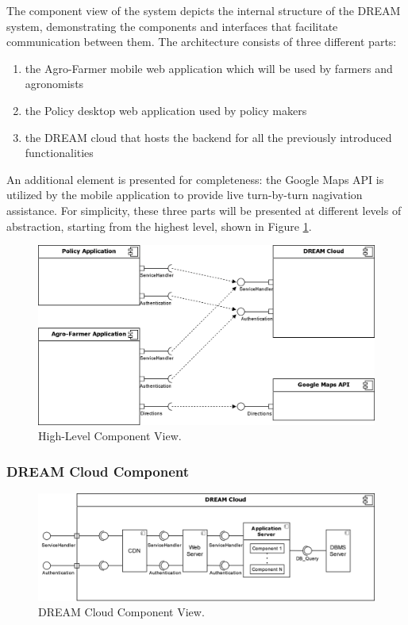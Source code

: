 The component view of the system depicts the internal structure of the DREAM system, demonstrating the components and interfaces that facilitate communication between them. The architecture consists of three different parts:
\begin{enumerate}
	\item the Agro-Farmer mobile web application which will be used by farmers and agronomists
	\item the Policy desktop web application used by policy makers
	\item the DREAM cloud that hosts the backend for all the previously introduced functionalities
\end{enumerate}
An additional element is presented for completeness: the Google Maps API is utilized by the mobile application to provide live turn-by-turn nagivation assistance. For simplicity, these three parts will be presented at different levels of abstraction, starting from the highest level, shown in Figure \ref{fig:highLevelComp}.\\

\begin{figure}[hbt!]
\centering
\includegraphics[width=\textwidth]{../images_diagrams/dd/high_level_cloud.png}
\caption{High-Level Component View.}
\label{fig:highLevelComp}
\end{figure}

\subsubsection{DREAM Cloud Component} \label{sect:cloudComponent}

\begin{figure}[hbt!]
\centering
\includegraphics[width=\textwidth]{../images_diagrams/dd/component_only_cloud.png}
\caption{DREAM Cloud Component View.}
\label{fig:CloudOnlyComp}
\end{figure}

